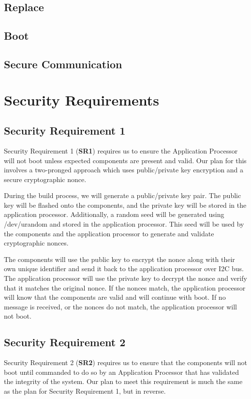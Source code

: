 \documentclass{prace}
\begin{document}
\subsection{Replace}

\subsection{Boot}

\subsection{Secure Communication}

\section{Security Requirements}

\subsection{Security Requirement 1}
Security Requirement 1 (\textbf{SR1}) requires us to ensure the Application Processor will not boot unless
expected components are present and valid. Our plan for this involves a two-pronged approach
which uses public/private key encryption and a secure cryptographic nonce.

During the build process, we will generate a public/private key pair. The public key will be
flashed onto the components, and the private key will be stored in the application processor.
Additionally, a random seed will be generated using /dev/urandom and stored in the application
processor. This seed will be used by the components and the application processor to generate
and validate cryptographic nonces.

The components will use the public key to encrypt the nonce along with their own
unique identifier and send it back to the application processor over I2C bus. The application
processor will use the private key to decrypt the nonce and verify that it matches the original
nonce. If the nonces match, the application processor will know that the components are valid
and will continue with boot. If no message is received, or the nonces do not match, the application
processor will not boot.

\subsection{Security Requirement 2}
Security Requirement 2 (\textbf{SR2}) requires us to ensure that the components will not boot until commanded
to do so by an Application Processor that has validated the integrity of the system. Our plan to
meet this requirement is much the same as the plan for Security Requirement 1, but in reverse.
\end{document}
